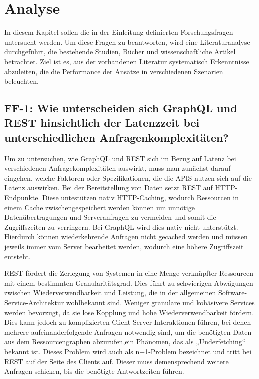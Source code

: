 \chapter{Analyse} %
\label{sec:analyse}
In diesem Kapitel sollen die in der Einleitung definierten Forschungsfragen untersucht werden. Um diese Fragen zu beantworten, wird eine Literaturanalyse durchgeführt, die bestehende Studien, Bücher und wissenschaftliche Artikel betrachtet. Ziel ist es, aus der vorhandenen Literatur systematisch Erkenntnisse abzuleiten, die die Performance der Ansätze in verschiedenen Szenarien beleuchten.

\section{FF-1: Wie unterscheiden sich GraphQL und REST hinsichtlich der Latenzzeit bei unterschiedlichen Anfragenkomplexitäten?} %
\label{sec:ff1}
Um zu untersuchen, wie GraphQL und REST sich im Bezug auf Latenz bei verschiedenen Anfragekomplexitäten auswirkt, muss man zunächst darauf eingehen, welche Faktoren oder Spezifikationen, die die APIS nutzen sich auf die Latenz auswirken.
Bei der Bereitstellung von Daten setzt REST auf HTTP-Endpunkte. Diese untestützen nativ HTTP-Caching,  wodurch Ressourcen in einem Cache zwischengespeichert werden können um unnötige Datenübertragungen und Serveranfragen zu vermeiden und somit die Zugriffszeiten zu verringern.
Bei GraphQL wird dies nativ nicht unterstützt. Hierdurch können wiederkehrende Anfragen nicht gecached werden und müssen jeweils immer vom Server bearbeitet werden, wodurch eine höhere Zugriffszeit entsteht. \citep{graphqlreplacerest}

\noindent
REST fördert die Zerlegung von Systemen in eine Menge verknüpfter Ressourcen mit einem bestimmten Granularitätsgrad. Dies führt zu schwierigen Abwägungen zwischen Wiederverwendbarkeit und Leistung, die in der allgemeinen Software-Service-Architektur wohlbekannt sind. Weniger granulare und kohäsivere Services werden bevorzugt, da sie lose Kopplung und hohe Wiederverwendbarkeit fördern. Dies kann jedoch zu komplizierten Client-Server-Interaktionen führen, bei denen mehrere aufeinanderfolgende Anfragen notwendig sind, um die benötigten Daten aus dem Ressourcengraphen abzurufen,ein Phänomen, das als „Underfetching“ bekannt ist. Dieses Problem wird auch als n+1-Problem bezeichnet und tritt bei REST auf der Seite des Clients auf. Dieser muss demensprechend weitere Anfragen schicken, bis die benötigte Antwortzeiten führen. \citep{graphqlhealth} \citep{migrategraphql}

